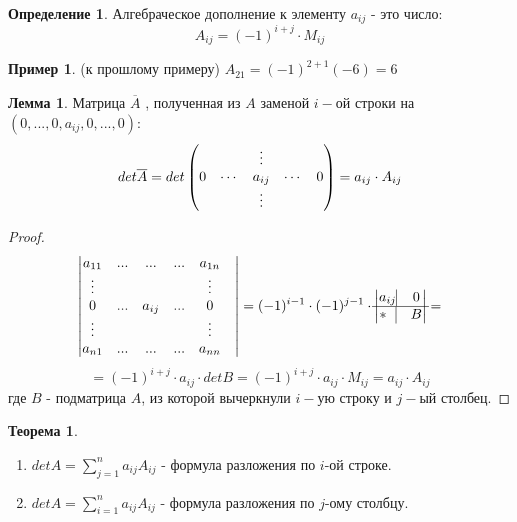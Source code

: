 \documentclass[a4paper, 12pt]{article}
\newcommand\tab[1][.5cm]{\hspace*{#1}}
\newcounter{thcount}
\theoremstyle{definition}
\newtheorem*{definition}{Определение}
\newtheorem*{lemma}{Лемма}
\newtheorem*{example1}{Пример}
\newtheorem{theoremnum}[thcount]{Теорема}
\begin{document}
  \begin{definition}
    Алгебраческое дополнение к элементу $a_{ij}$ - это число: $$A_{ij} = (-1)^{i+j} \cdot M_{ij}$$ 
  \end{definition} 
  \begin{example1}
    (к прошлому примеру) $A_{21} = (-1)^{2+1}(-6) = 6$  
  \end{example1}

  \begin{lemma}
    Матрица $\overline{A}$ , полученная из $A$ заменой $i-$ой строки на \\$(0,...,0,a_{ij},0,...,0)$:
    $$det \overline{A} = det \begin{pmatrix}
      \null & \null & \vdots & \null & \null \\
      0 & \cdots & a_{ij} & \cdots & 0 \\
      \null & \null & \vdots & \null & \null \end{pmatrix} = a_{ij} \cdot A_{ij}$$  
  \end{lemma} 
  \begin{proof}
    $$\begin{vmatrix}
      a_{11} & ... & ... & ... & a_{1n} \\
      \vdots & \null & \null & \null & \vdots & \\
      0 & ... & a_{ij} & ... & 0 \\
      \vdots & \null & \null & \null & \vdots & \\
      a_{n1} &  ... & ... & ... & a_{nn}
    \end{vmatrix} = (-1)^{i-1} \cdot (-1)^{j-1} \cdot \begin{vmatrix}
      a_{ij} \vline &  0 \\
      \hline 
      * \ \ \vline & B
    \end{vmatrix} = $$ $$ =(-1)^{i+j} \cdot a_{ij}\cdot detB = (-1)^{i+j} \cdot a_{ij} \cdot M_{ij} = a_{ij}\cdot A_{ij}$$
    где $B$ - подматрица $A$, из которой вычеркнули $i-$ую строку и $j-$ый столбец.
  \end{proof} 
  \begin{theoremnum}
    \begin{enumerate} \tab
      \item $detA = \sum \limits_{j=1}^na_{ij}A_{ij}$ - формула разложения по $i$-ой строке.
      \item $detA = \sum \limits_{i=1}^na_{ij}A_{ij}$ - формула разложения по $j$-ому столбцу.
    \end{enumerate}
  \end{theoremnum} 
\end{document}

